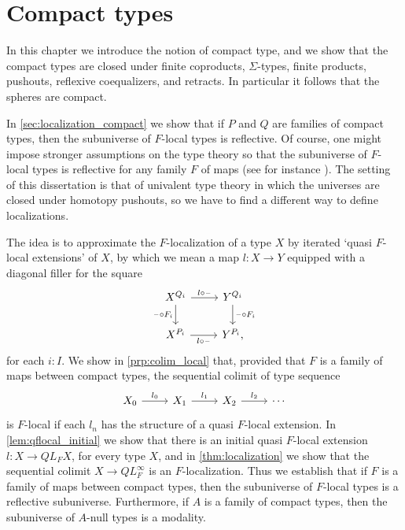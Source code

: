 \chapter{Compact types}

In this chapter we introduce the notion of compact type, and we show that the compact types are closed under finite coproducts, $\Sigma$-types, finite products, pushouts, reflexive coequalizers, and retracts. In particular it follows that the spheres are compact.

In \cref{sec:localization_compact} we show that if $P$ and $Q$ are families of compact types, then the subuniverse of $F$-local types is reflective. Of course, one might impose stronger assumptions on the type theory so that the subuniverse of $F$-local types is reflective for any family $F$ of maps (see for instance \cite{RijkeShulmanSpitters}). The setting of this dissertation is that of univalent type theory in which the universes are closed under homotopy pushouts, so we have to find a different way to define localizations.

The idea is to approximate the $F$-localization of a type $X$ by iterated `quasi $F$-local extensions' of $X$, by which we mean a map $l:X\to Y$ equipped with a diagonal filler for the square
\begin{equation*}
\begin{tikzcd}
X^{Q_i} \arrow[r,"l\circ\blank"] \arrow[d,swap,"\blank\circ F_i"] & Y^{Q_i} \arrow[d,"\blank\circ F_i"] \\
X^{P_i} \arrow[r,swap,"l\circ \blank"] & Y^{P_i},
\end{tikzcd}
\end{equation*}
for each $i:I$. We show in \cref{prp:colim_local} that, provided that $F$ is a family of maps between compact types, the sequential colimit of type sequence
\begin{equation*}
\begin{tikzcd}
X_0 \arrow[r,"l_0"] & X_1 \arrow[r,"l_1"] & X_2 \arrow[r,"l_2"] & \cdots
\end{tikzcd}
\end{equation*}
is $F$-local if each $l_n$ has the structure of a quasi $F$-local extension. In \cref{lem:qflocal_initial} we show that there is an initial quasi $F$-local extension $l:X\to QL_F X$, for every type $X$, and in \cref{thm:localization} we show that the sequential colimit $X\to QL_F^\infty$ is an $F$-localization. Thus we establish that if $F$ is a family of maps between compact types, then the subuniverse of $F$-local types is a reflective subuniverse. Furthermore, if $A$ is a family of compact types, then the subuniverse of $A$-null types is a modality.

